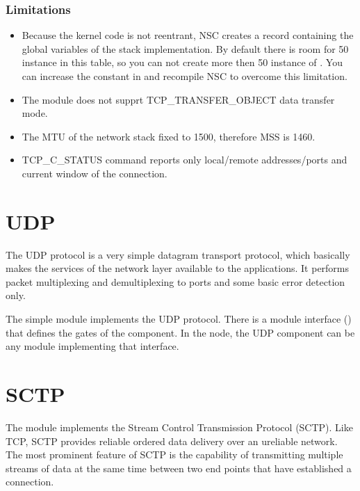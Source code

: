 \subsubsection*{Limitations}

\begin{itemize}
  \item Because the kernel code is not reentrant, NSC creates a record containing
    the global variables of the stack implementation. By default there is room
    for 50 instance in this table, so you can not create more then 50 instance
    of . You can increase the  constant
    in  and recompile NSC to overcome this limitation.
  \item The  module does not supprt TCP\_TRANSFER\_OBJECT
    data transfer mode.
  \item The MTU of the network stack fixed to 1500, therefore MSS is 1460.
  \item TCP\_C\_STATUS command reports only local/remote addresses/ports and
    current window of the connection.
\end{itemize}

\section{UDP}
\label{sec:transport:udp}

The UDP protocol is a very simple datagram transport protocol, which
basically makes the services of the network layer available to the applications.
It performs packet multiplexing and demultiplexing to ports and some basic
error detection only.

The  simple module implements the UDP protocol.
There is a module interface () that defines the gates of the
 component. In the  node, the UDP component
can be any module implementing that interface.


\section{SCTP}
\label{sec:transport:sctp}

The  module implements the Stream Control Transmission Protocol
(SCTP). Like TCP, SCTP provides reliable ordered data delivery over an ureliable
network. The most prominent feature of SCTP is the capability of transmitting
multiple streams of data at the same time between two end points that have
established a connection.

